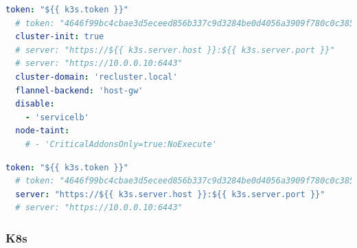\begin{lstlisting}[language=yaml, alsoletter={.-}, morekeywords={[2]{token, cluster-init, cluster-domain, flannel-backend, disable, node-taint}}, xleftmargin=\parindent, label={lst:k3s_controller_config}, caption=TODO]
  token: "${{ k3s.token }}"
  # token: "4646f99bc4cbae3d5eceed856b337c9d3284be0d4056a3909f780c0c385fbf93"
  cluster-init: true
  # server: "https://${{ k3s.server.host }}:${{ k3s.server.port }}"
  # server: "https://10.0.0.10:6443"
  cluster-domain: 'recluster.local'
  flannel-backend: 'host-gw'
  disable:
    - 'servicelb'
  node-taint:
    # - 'CriticalAddonsOnly=true:NoExecute'
\end{lstlisting}

\begin{lstlisting}[language=yaml, alsoletter={.}, morekeywords={[2]{token, server}}, xleftmargin=\parindent, label={lst:k3s_worker_config}, caption=TODO]
  token: "${{ k3s.token }}"
  # token: "4646f99bc4cbae3d5eceed856b337c9d3284be0d4056a3909f780c0c385fbf93"
  server: "https://${{ k3s.server.host }}:${{ k3s.server.port }}"
  # server: "https://10.0.0.10:6443"
\end{lstlisting}

\subsubsection{K8s}
\label{subsubsec:implementation_installer_configuration_filesn_k8s}


